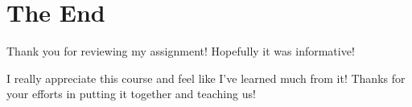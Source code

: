 \documentclass[]{article}
\begin{document}
\section{The End}\label{the-end}

Thank you for reviewing my assignment! Hopefully it was informative!

I really appreciate this course and feel like I've learned much from it!
Thanks for your efforts in putting it together and teaching us!
\end{document}
